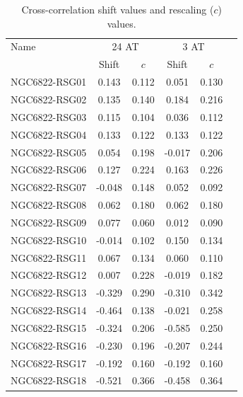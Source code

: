 \begin{table}
 \caption[$c$-values]{
    Cross-correlation shift values and rescaling ($c$) values.
    }
 \label{c value}
 \begin{center}
  \begin{tabular}{lccccc}
   \hline
 Name  & \multicolumn{2}{c}{24 AT}  & \multicolumn{2}{c}{3 AT} \\
 &  Shift &  $c$  & Shift &  $c$\\
   \hline
   NGC6822-RSG01 &  0.143 & 0.112  &  0.051 & 0.130  \\ %
   NGC6822-RSG02 &  0.135 & 0.140  &  0.184 & 0.216  \\ %
   NGC6822-RSG03 &  0.115 & 0.104  &  0.036 & 0.112  \\ %
   NGC6822-RSG04 &  0.133 & 0.122  &  0.133 & 0.122  \\ %
   NGC6822-RSG05 &  0.054 & 0.198  & -0.017 & 0.206  \\ %
   NGC6822-RSG06 &  0.127 & 0.224  &  0.163 & 0.226  \\ %
   NGC6822-RSG07 & -0.048 & 0.148  &  0.052 & 0.092  \\ %
   NGC6822-RSG08 &  0.062 & 0.180  &  0.062 & 0.180  \\ %
   NGC6822-RSG09 &  0.077 & 0.060  &  0.012 & 0.090  \\ %
   NGC6822-RSG10 & -0.014 & 0.102  &  0.150 & 0.134  \\ %
   NGC6822-RSG11 &  0.067 & 0.134  &  0.060 & 0.110  \\ %
   NGC6822-RSG12 &  0.007 & 0.228  & -0.019 & 0.182  \\ %
   NGC6822-RSG13 & -0.329 & 0.290  & -0.310 & 0.342  \\ %
   NGC6822-RSG14 & -0.464 & 0.138  & -0.021 & 0.258  \\ %
   NGC6822-RSG15 & -0.324 & 0.206  & -0.585 & 0.250  \\ %
   NGC6822-RSG16 & -0.230 & 0.196  & -0.207 & 0.244  \\ %
   NGC6822-RSG17 & -0.192 & 0.160  & -0.192 & 0.160  \\ %
   NGC6822-RSG18 & -0.521 & 0.366  & -0.458 & 0.364  \\ %
   \hline
  \end{tabular}
 \end{center}
\end{table}



